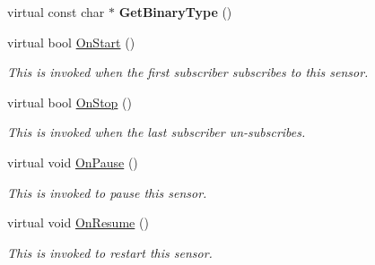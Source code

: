 \begin{DoxyCompactItemize}
virtual const char $\ast$ {\bfseries Get\+Binary\+Type} ()
\item 
\mbox{\label{class_microphone_a786ace62e9a59713e190a036e51a15d3}} 
virtual bool \hyperlink{class_microphone_a786ace62e9a59713e190a036e51a15d3}{On\+Start} ()
\begin{DoxyCompactList}\small\item\em This is invoked when the first subscriber subscribes to this sensor. \end{DoxyCompactList}\item 
\mbox{\label{class_microphone_af68dd773dbd3bfb381aa827f3ec30196}} 
virtual bool \hyperlink{class_microphone_af68dd773dbd3bfb381aa827f3ec30196}{On\+Stop} ()
\begin{DoxyCompactList}\small\item\em This is invoked when the last subscriber un-\/subscribes. \end{DoxyCompactList}\item 
\mbox{\label{class_microphone_a7afee929c83661709b4cf81624e2ff38}} 
virtual void \hyperlink{class_microphone_a7afee929c83661709b4cf81624e2ff38}{On\+Pause} ()
\begin{DoxyCompactList}\small\item\em This is invoked to pause this sensor. \end{DoxyCompactList}\item 
\mbox{\label{class_microphone_a2e0a9c0d26319bdb4d2191fc6567a15b}} 
virtual void \hyperlink{class_microphone_a2e0a9c0d26319bdb4d2191fc6567a15b}{On\+Resume} ()
\begin{DoxyCompactList}\small\item\em This is invoked to restart this sensor. \end{DoxyCompactList}\end{DoxyCompactItemize}

